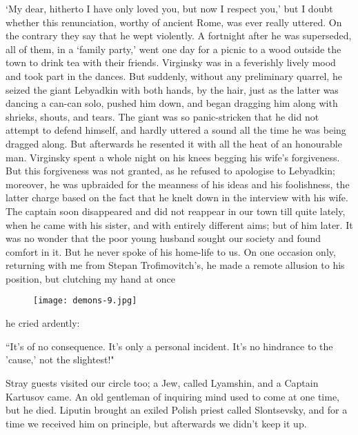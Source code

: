 \documentclass[12pt]{article}
\begin{document}
\vspace{12pt}
`My dear, hitherto I have only loved you, but now I respect you,' but I
doubt whether this renunciation, worthy of ancient Rome, was ever really
uttered. On the contrary they say that he wept violently. A fortnight
after he was superseded, all of them, in a `family party,' went one day
for a picnic to a wood outside the town to drink tea with their friends.
Virginsky was in a feverishly lively mood and took part in the dances.
But suddenly, without any preliminary quarrel, he seized the giant
Lebyadkin with both hands, by the hair, just as the latter was dancing
a can-can solo, pushed him down, and began dragging him along with
shrieks, shouts, and tears. The giant was so panic-stricken that he did
not attempt to defend himself, and hardly uttered a sound all the time
he was being dragged along. But afterwards he resented it with all the
heat of an honourable man. Virginsky spent a whole night on his knees
begging his wife's forgiveness. But this forgiveness was not granted, as
he refused to apologise to Lebyadkin; moreover, he was upbraided for the
meanness of his ideas and his foolishness, the latter charge based on
the fact that he knelt down in the interview with his wife. The captain
soon disappeared and did not reappear in our town till quite lately,
when he came with his sister, and with entirely different aims; but
of him later. It was no wonder that the poor young husband sought our
society and found comfort in it. But he never spoke of his home-life to
us. On one occasion only, returning with me from Stepan Trofimovitch's,
he made a remote allusion to his position, but clutching my hand at once
\begin{figure}[!ht]
\begin{center}
\texttt{[image: demons-9.jpg]}
\end{center}
\end{figure}
he cried ardently:


\vspace{12pt}
``It's of no consequence. It's only a personal incident. It's no
hindrance to the 'cause,' not the slightest!"


\vspace{12pt}
Stray guests visited our circle too; a Jew, called Lyamshin, and a
Captain Kartusov came. An old gentleman of inquiring mind used to come
at one time, but he died. Liputin brought an exiled Polish priest called
Slontsevsky, and for a time we received him on principle, but afterwards
we didn't keep it up.
\end{document}

